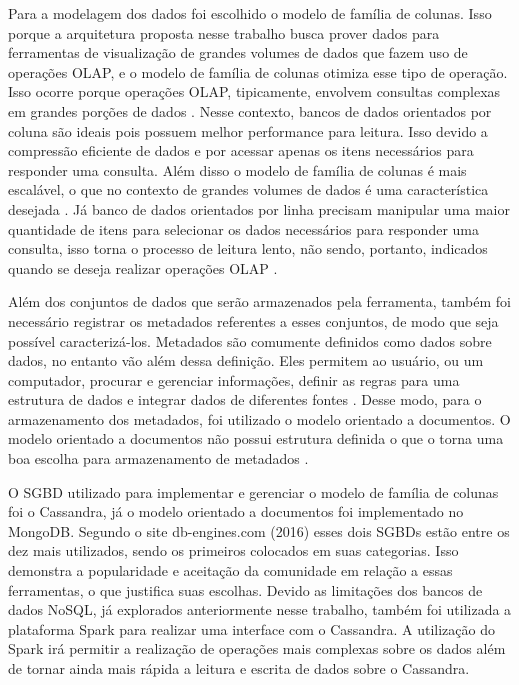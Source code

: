 Para a modelagem dos dados foi escolhido o modelo de família de colunas. Isso porque a 
arquitetura proposta nesse trabalho busca prover dados para ferramentas de visualização 
de grandes volumes de dados que fazem uso de operações OLAP, e o modelo de família de 
colunas otimiza esse tipo de operação. Isso ocorre porque operações OLAP, tipicamente, 
envolvem consultas complexas em grandes porções de dados \cite{sorjonen2012olap}. Nesse contexto, 
bancos de dados orientados por coluna são ideais pois possuem melhor performance para leitura. 
Isso devido a compressão eficiente de dados e por acessar apenas os itens necessários para 
responder uma consulta. Além disso o modelo de família de colunas é mais escalável, o que no 
contexto de grandes volumes de dados é uma característica desejada
\cite{moniruzzaman2013nosql}. Já banco de dados orientados por linha precisam manipular 
uma maior quantidade de itens para selecionar os dados necessários para responder uma 
consulta, isso torna o processo de leitura lento, não sendo, portanto, indicados quando se 
deseja realizar operações OLAP \cite{sorjonen2012olap}. 

Além dos conjuntos de dados que serão armazenados pela ferramenta, também foi necessário 
registrar os metadados referentes a esses conjuntos, de modo que seja possível 
caracterizá-los. Metadados são comumente definidos como dados sobre dados, no entanto vão 
além dessa definição. Eles permitem ao usuário, ou um computador, procurar e gerenciar 
informações, definir as regras para uma estrutura de dados e integrar dados de diferentes 
fontes \cite{turner2002metadata}. Desse modo, para o armazenamento dos metadados, foi 
utilizado o modelo orientado a documentos. O modelo orientado a documentos não possui 
estrutura definida o que o torna uma boa escolha para armazenamento de metadados 
\cite{de2010nosql}.

O SGBD utilizado para implementar e gerenciar o modelo de família de colunas foi o 
Cassandra, já o modelo orientado a documentos foi implementado no MongoDB. 
Segundo o site db-engines.com (2016) esses dois SGBDs estão entre os dez mais utilizados, 
sendo os primeiros colocados em suas categorias. Isso demonstra a popularidade e aceitação 
da comunidade em relação a essas ferramentas, o que justifica suas escolhas. Devido as limitações 
dos bancos de dados NoSQL, já explorados anteriormente nesse trabalho, também foi utilizada 
a plataforma Spark para realizar uma interface com o Cassandra. A utilização do Spark irá 
permitir a realização de operações mais complexas sobre os dados além de tornar ainda mais 
rápida a leitura e escrita de dados sobre o Cassandra.

